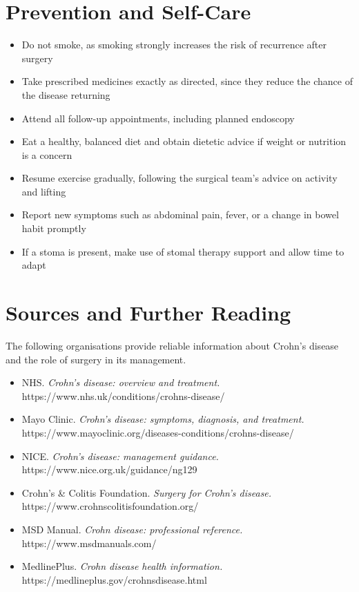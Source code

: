 \section*{Prevention and Self-Care}
\begin{itemize}
    \item Do not smoke, as smoking strongly increases the risk of recurrence after surgery
    \item Take prescribed medicines exactly as directed, since they reduce the chance of the disease returning
    \item Attend all follow-up appointments, including planned endoscopy
    \item Eat a healthy, balanced diet and obtain dietetic advice if weight or nutrition is a concern
    \item Resume exercise gradually, following the surgical team's advice on activity and lifting
    \item Report new symptoms such as abdominal pain, fever, or a change in bowel habit promptly
    \item If a stoma is present, make use of stomal therapy support and allow time to adapt
\end{itemize}

\section*{Sources and Further Reading}
The following organisations provide reliable information about Crohn's disease and the role of surgery in its management.

\begin{itemize}
    \item NHS. \textit{Crohn's disease: overview and treatment.} https://www.nhs.uk/conditions/crohns-disease/
    \item Mayo Clinic. \textit{Crohn's disease: symptoms, diagnosis, and treatment.} https://www.mayoclinic.org/diseases-conditions/crohns-disease/
    \item NICE. \textit{Crohn's disease: management guidance.} https://www.nice.org.uk/guidance/ng129
    \item Crohn's \& Colitis Foundation. \textit{Surgery for Crohn's disease.} https://www.crohnscolitisfoundation.org/
    \item MSD Manual. \textit{Crohn disease: professional reference.} https://www.msdmanuals.com/
    \item MedlinePlus. \textit{Crohn disease health information.} https://medlineplus.gov/crohnsdisease.html
\end{itemize}
